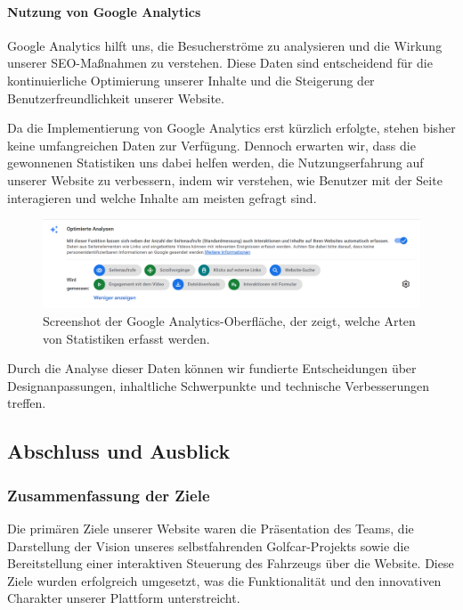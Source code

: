 \paragraph{Nutzung von Google Analytics}
Google Analytics hilft uns, die Besucherströme zu analysieren und die Wirkung unserer SEO-Maßnahmen zu verstehen. Diese Daten sind entscheidend für die kontinuierliche Optimierung unserer Inhalte und die Steigerung der Benutzerfreundlichkeit unserer Website.

Da die Implementierung von Google Analytics erst kürzlich erfolgte, stehen bisher keine umfangreichen Daten zur Verfügung. Dennoch erwarten wir, dass die gewonnenen Statistiken uns dabei helfen werden, die Nutzungserfahrung auf unserer Website zu verbessern, indem wir verstehen, wie Benutzer mit der Seite interagieren und welche Inhalte am meisten gefragt sind.

\begin{figure}[h]
    \centering
    \includegraphics[width=\linewidth]{Resources/google_analytics.png}
    \caption{Screenshot der Google Analytics-Oberfläche, der zeigt, welche Arten von Statistiken erfasst werden.}
\end{figure}

Durch die Analyse dieser Daten können wir fundierte Entscheidungen über Designanpassungen, inhaltliche Schwerpunkte und technische Verbesserungen treffen.


\subsection{Abschluss und Ausblick}

\subsubsection{Zusammenfassung der Ziele}
Die primären Ziele unserer Website waren die Präsentation des Teams, die Darstellung der Vision unseres selbstfahrenden Golfcar-Projekts sowie die Bereitstellung einer interaktiven Steuerung des Fahrzeugs über die Website. Diese Ziele wurden erfolgreich umgesetzt, was die Funktionalität und den innovativen Charakter unserer Plattform unterstreicht.

